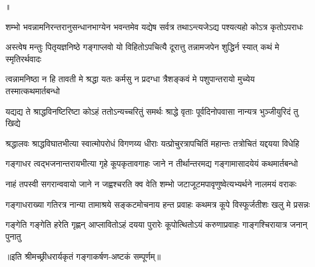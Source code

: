 
॥

\twolineshloka
{शम्भो भवन्नामनिरन्तरानुसन्धानभाग्येन भवन्तमेव}
{यद्येष सर्वत्र तथाऽन्त्यजेऽद्य पश्यत्यहो कोऽत्र कृतोऽपराधः}%

\twolineshloka
{अस्त्वेष मन्तुः पितृयज्ञनिष्ठे गङ्गाप्लवो यो विहितोऽपचित्यै}
{दूरात्तु तन्नामजपेन शुद्धिर्न स्यात् कथं मे स्मृतिरर्थवादः}%

\twolineshloka
{त्वन्नामनिष्ठा न हि तावती मे श्रद्धा यतः कर्मसु न प्रदग्धा}
{त्रैशङ्कवं मे पशुपान्तरायो मुच्येय तस्मात्कथमार्तबन्धो}%

\twolineshloka
{यद्यद्य ते श्राद्धविनष्टिरिष्टा कोऽहं ततोऽन्यच्चरितुं समर्थः}
{श्राद्धे वृताः पूर्वदिनोपवासा नान्यत्र भुञ्जीयुरिदं तु खिद्ये}%

\twolineshloka
{श्रद्धालवः श्राद्धविघातभीत्या स्वात्मोपरोधं विगणय्य धीराः}
{यत्प्रोचुरत्रापचितिं महान्तः तत्रोचितं यद्दयया विधेहि}%

\twolineshloka
{गङ्गाधर त्वद्भजनान्तरायभीत्या गृहे कूपकृतावगाहः}
{जाने न तीर्थान्तरमद्य गङ्गामासादयेयं कथमार्तबन्धो}%

\twolineshloka
{नाहं तपस्वी सगरान्ववायो जाने न जह्वश्चरति क्व वेति}
{शम्भो जटाजूटमपावृणुष्वेत्यभ्यर्थने नालमयं वराकः}%

\twolineshloka
{गङ्गाधराख्या गतिरत्र नान्या तामाश्रये सङ्कटमोचनाय}
{हन्त प्रवाहः कथमत्र कूपे विस्फूर्जतीशः खलु मे प्रसन्नः}%

\twolineshloka
{गङ्गेति गङ्गेति हरेति गृह्णन् आप्लावितोऽहं दयया पुरारेः}
{कूपोत्थितोऽयं करुणाप्रवाहः गाङ्गश्चिरायात्र जनान् पुनातु}%


॥इति श्रीमच्छ्रीधरार्यकृतं गङ्गाकर्षण-अष्टकं सम्पूर्णम्॥